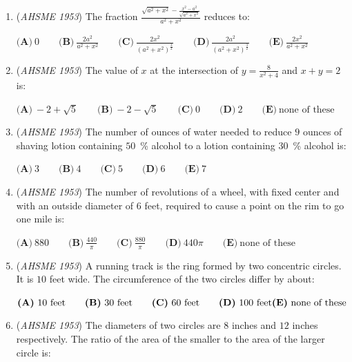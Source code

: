 \begin{enumerate}
 $\textbf{(A)}\ 10(q - 1) \qquad \textbf{(B)}\ \frac {2}{5}(4q - 4) \qquad \textbf{(C)}\ \frac {2}{5}(q - 1) \\  \textbf{(D)}\ \frac{5}{2}(q-1)\qquad \textbf{(E)}\ \text{none of these}$


	\item (\textit{AHSME 1953}) The fraction $\frac{\sqrt{a^2+x^2}-\frac{x^2-a^2}{\sqrt{a^2+x^2}}}{a^2+x^2}$ reduces to: 


 $\textbf{(A)}\ 0 \qquad \textbf{(B)}\ \frac{2a^2}{a^2+x^2} \qquad \textbf{(C)}\ \frac{2x^2}{(a^2+x^2)^{\frac{3}{2}}}\qquad \textbf{(D)}\ \frac{2a^2}{(a^2+x^2)^{\frac{3}{2}}}\qquad \textbf{(E)}\ \frac{2x^2}{a^2+x^2}$


	\item (\textit{AHSME 1953}) The value of $x$ at the intersection of $y=\frac{8}{x^2+4}$ and $x+y=2$ is: 


 $\textbf{(A)}\ -2+\sqrt{5} \qquad \textbf{(B)}\ -2-\sqrt{5} \qquad \textbf{(C)}\ 0 \qquad \textbf{(D)}\ 2 \qquad \textbf{(E)}\ \text{none of these}$


	\item (\textit{AHSME 1953}) The number of ounces of water needed to reduce $9$ ounces of shaving lotion containing $50$ \% alcohol to a lotion containing $30$ \% alcohol is: 


 $\textbf{(A)}\ 3 \qquad \textbf{(B)}\ 4 \qquad \textbf{(C)}\ 5 \qquad \textbf{(D)}\ 6 \qquad \textbf{(E)}\ 7$


	\item (\textit{AHSME 1953}) The number of revolutions of a wheel, with fixed center and with an outside diameter of $6$ feet, required to cause a point on the rim to go one mile is: 


 $\textbf{(A)}\ 880 \qquad \textbf{(B)}\ \frac{440}{\pi} \qquad \textbf{(C)}\ \frac{880}{\pi} \qquad \textbf{(D)}\ 440\pi\qquad \textbf{(E)}\ \text{none of these}$


	\item (\textit{AHSME 1953}) A running track is the ring formed by two concentric circles. It is $10$ feet wide. The circumference of the two circles differ by about: 


 $\textbf{(A)}\ 10\text{ feet} \qquad \textbf{(B)}\ 30\text{ feet} \qquad \textbf{(C)}\ 60\text{ feet} \qquad \textbf{(D)}\ 100\text{ feet}\\ \textbf{(E)}\ \text{none of these}$


	\item (\textit{AHSME 1953}) The diameters of two circles are $8$ inches and $12$ inches respectively. The ratio of the area of the smaller to the area of the larger circle is: 



\end{enumerate}
